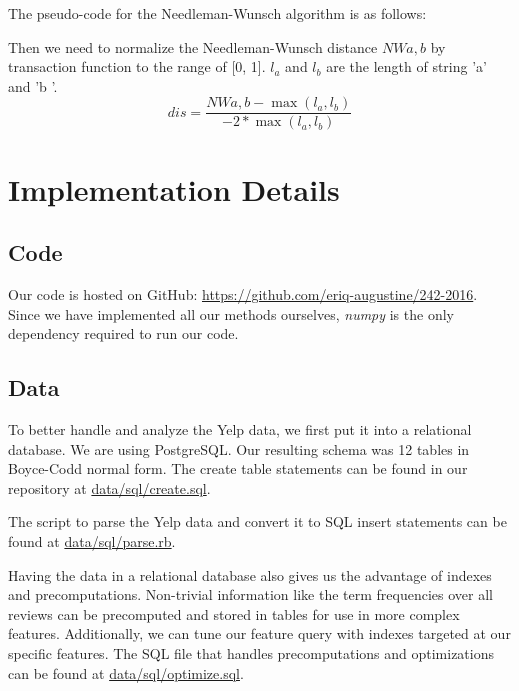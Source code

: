 \documentclass{article}
\begin{document}
The pseudo-code for the Needleman-Wunsch algorithm is as follows:

\begin{algorithmic}
\ENDFOR
{}
\ENDFOR
{}
\ENDFOR
\end{algorithmic}
Then we need to normalize the Needleman-Wunsch distance $NW{a,b}$ by transaction function to the range of [0, 1]. $l_{a}$ and $l_{b}$ are the length of string 'a' and 'b '.
$$dis = \frac{NW{a,b} - {\max}(l_{a}, l_{b})}{-2 * {\max}(l_{a}, l_{b})}  $$

\section{Implementation Details}
\subsection{Code}
Our code is hosted on GitHub: \href{https://github.com/eriq-augustine/242-2016}{https://github.com/eriq-augustine/242-2016}.
Since we have implemented all our methods ourselves, \textit{numpy} is the only dependency required to run our code.

\subsection{Data}
To better handle and analyze the Yelp data, we first put it into a relational database.
We are using PostgreSQL.
Our resulting schema was 12 tables in Boyce-Codd normal form.
The create table statements can be found in our repository at \href{https://github.com/eriq-augustine/242-2016/blob/master/data/sql/create.sql}{data/sql/create.sql}.

The script to parse the Yelp data and convert it to SQL insert statements can be found at \href{https://github.com/eriq-augustine/242-2016/blob/master/data/sql/parse.rb}{data/sql/parse.rb}.

Having the data in a relational database also gives us the advantage of indexes and precomputations.
Non-trivial information like the term frequencies over all reviews can be precomputed and stored in tables for use in more complex features.
Additionally, we can tune our feature query with indexes targeted at our specific features.
The SQL file that handles precomputations and optimizations can be found at \href{https://github.com/eriq-augustine/242-2016/blob/master/data/sql/optimize.sql}{data/sql/optimize.sql}.
\end{document}
